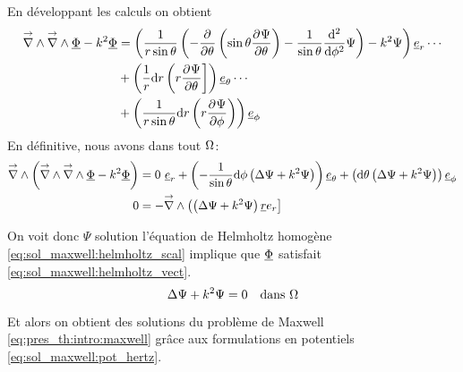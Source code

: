 % 
En développant les calculs on obtient
\begin{align*}
  {\overset{\rightarrow}{\nabla}}\wedge {\overset{\rightarrow}{\nabla}}\wedge \underline{\Phi} - k^2 \underline{\Phi} 
  &= \left(\dfrac{1}{r\sin\theta}\left(-\dfrac{\partial^{{}} }{{\partial \theta}^{{}}}\left(\sin\theta\dfrac{\partial^{{}} \Psi}{{\partial \theta}^{{}}}\right)-\dfrac{1}{\sin\theta}\dfrac{\mathrm{d}^2}{\mathrm{d} \phi^2}\Psi\right)-k^2\Psi\right)\underline{e}_r \cdots \\
  &+ \left(\dfrac{1}{r}\mathrm{d}{r}{}\left(r\dfrac{\partial^{{}} \Psi}{{\partial \theta}^{{}}}\right]\right)\underline{e}_\theta \cdots \\
  &+ \left(\dfrac{1}{r\sin\theta}\mathrm{d}{r}{}\left(r\dfrac{\partial^{{}} \Psi}{{\partial \phi}^{{}}}\right)\right)\underline{e}_\phi
\end{align*}
En définitive, nous avons dans tout $\Omega$:
\begin{align*}
  \vrot\left(\vrot \vrot \v \Phi - k^2 \v \Phi\right) 
  &= %
   0 ~ \v e_r 
  + \left(-\frac{1}{\sin\theta}\dd{\phi}{}\left(\Delta \Psi + k^2 \Psi \right)\right)\v e_\theta 
  + \left(\dd{\theta}{}\left(\Delta \Psi + k^2 \Psi \right)\right)\v e_\phi \\
  0 &= -\vrot \left( \left(\Delta \Psi + k^2\Psi\right)\v r e_r\right]
\end{align*}

On voit donc $\Psi$ solution l'équation de Helmholtz homogène  \eqref{eq:sol_maxwell:helmholtz_scal} implique que $\underline{\Phi}$ satisfait \eqref{eq:sol_maxwell:helmholtz_vect}.
\begin{equation}
  \label{eq:sol_maxwell:helmholtz_scal}
   \Delta \Psi + k^2\Psi = 0 \quad \text{dans $\Omega$}
\end{equation}

Et alors on obtient des solutions du problème de Maxwell \eqref{eq:pres_th:intro:maxwell} grâce aux formulations en potentiels \eqref{eq:sol_maxwell:pot_hertz}.
